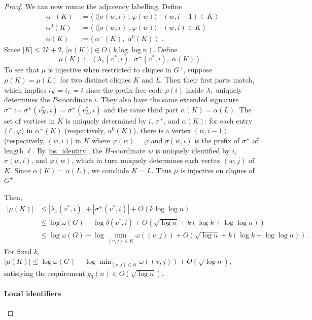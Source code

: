 \documentclass{patmorin}
\let\eqref\cref
\renewcommand{\le}{\leqslant}
\newcommand{\Oh}{O}
\begin{document}
\begin{proof}
    We can now mimic the adjacency labelling.  Define
    \begin{align*}
      \alpha^-(K)
       & := \langle\; \langle |\sigma(w,i)|, \varphi(w)\rangle \mid (w,i-1)\in K \;\rangle \\
      \alpha^0(K)
       & := \langle\; \langle |\sigma(w,i)|, \varphi(w)\rangle \mid (w,i)\in K \;\rangle   \\
      \alpha(K)
       & := \langle\; \alpha^-(K),\; \alpha^0(K)  \;\rangle \enspace .
    \end{align*}
    Since $|K|\le 2k+2$, $|\alpha(K)|\in\Oh(k\log\log n)$.  Define
    \[
      \mu(K) := \langle\; \lambda_1(v^*,i),\; \sigma^+(v^*,i),\; \alpha(K) \;\rangle \enspace .
    \]
    To see that $\mu$ is injective when restricted to cliques in $G^+$, suppose $\mu(K)=\mu(L)$ for two distinct cliques $K$ and $L$.
    Then their first parts match, which implies $i_K=i_L=i$ since the prefix-free code $\rho(i)$ inside $\lambda_1$ uniquely determines the $P$-coordinate $i$.
    They also have the same extended signature $\sigma^+:=\sigma^+(v^*_K,i)=\sigma^+(v^*_L,i)$ and the same third part $\alpha(K)=\alpha(L)$.
    The set of vertices in $K$ is uniquely determined by $i$, $\sigma^+$, and $\alpha(K)$: for each entry $\langle \ell, \varphi \rangle$ in $\alpha^-(K)$ (respectively, $\alpha^0(K)$), there is a vertex $(w,i-1)$ (respectively, $(w,i)$) in $K$ where $\varphi(w)=\varphi$ and $\sigma(w,i)$ is the prefix of $\sigma^+$ of length $\ell$.
    By \eqref{ps_identity}, the $H$-coordinate $w$ is uniquely identified by $i$, $\sigma(w,i)$, and $\varphi(w)$, which in turn uniquely determines each vertex $(w,j)$ of $K$.
    Since $\alpha(K)=\alpha(L)$, we conclude $K=L$. Thus $\mu$ is injective on cliques of $G^+$.

    Then,
    \begin{align*}
      |\mu(K)|
       & \le |\lambda_1(v^*,i)| + |\sigma^+(v^*,i)| + \Oh(k \log\log n)                                       \\
       & \le \log\omega(G) - \log\delta(v^*,i) + \Oh(\sqrt{\log n} + k(\log k+\log\log n))                    \\
       & \le \log\omega(G) - \log\min_{(v,j)\in K}\omega((v,j)) + \Oh(\sqrt{\log n} + k(\log k+\log\log n)) .
    \end{align*}
    For fixed $k$, $|\mu(K)|\le \log\omega(G) - \log\min_{(v,j)\in K}\omega((v,j)) + \Oh(\sqrt{\log n})$, satisfying the requirement $g_3(n)\in\Oh(\sqrt{\log n})$.

    \paragraph{Local identifiers}


\end{proof}
\end{document}
